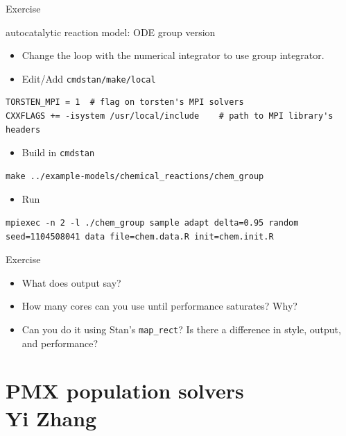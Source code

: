 \documentclass[presentation]{beamer}
\begin{document}
\begin{frame}[fragile,label={sec:orgaba9ca3}]{Exercise}
 \begin{block}{autocatalytic reaction model: ODE group version}
\begin{itemize}
\item Change the loop with the numerical integrator to use group
integrator.

\item Edit/Add \texttt{cmdstan/make/local}
\end{itemize}
\begin{verbatim}
TORSTEN_MPI = 1  # flag on torsten's MPI solvers
CXXFLAGS += -isystem /usr/local/include    # path to MPI library's headers
\end{verbatim}
\begin{itemize}
\item Build in \texttt{cmdstan}
\end{itemize}
\begin{verbatim}
make ../example-models/chemical_reactions/chem_group
\end{verbatim}
\begin{itemize}
\item Run
\end{itemize}
\begin{verbatim}
mpiexec -n 2 -l ./chem_group sample adapt delta=0.95 random seed=1104508041 data file=chem.data.R init=chem.init.R
\end{verbatim}
\end{block}
\end{frame}

\begin{frame}[fragile,label={sec:org5e01745}]{Exercise}
 \begin{itemize}
\item What does output say?
\item How many cores can you use until performance saturates? Why?
\item Can you do it using Stan's \texttt{map\_rect}? Is there a
difference in style, output, and performance?
\end{itemize}
\end{frame}

\section{PMX population solvers \\ \footnotesize{Yi Zhang}}
\label{sec:org30fea7b}
\end{document}
